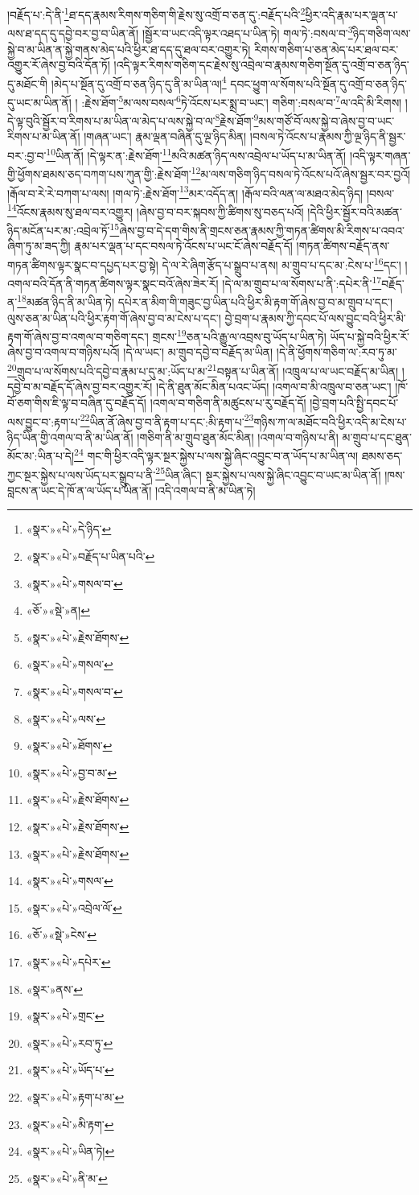 །བརྗོད་པ་:དེ་ནི་\footnote{«སྣར་»«པེ་»དེ་ཉིད་}ཐ་དད་རྣམས་རིགས་གཅིག་གི་རྗེས་སུ་འགྲོ་བ་ཅན་དུ་:བརྗོད་པའི་\footnote{«སྣར་»«པེ་»བརྗོད་པ་ཡིན་པའི་}ཕྱིར་འདི་རྣམ་པར་ལྡན་པ་ལས་ཐ་དད་དུ་དབྱེ་བར་བྱ་བ་ཡིན་ནོ། །སྦྱོར་བ་ཡང་འདི་ལྟར་འཐད་པ་ཡིན་ཏེ། གལ་ཏེ་:བསལ་བ་\footnote{«སྣར་»«པེ་»གསལ་བ་}ཉིད་གཅིག་ལས་སྐྱེ་བ་མ་ཡིན་ན་སྐྱེ་གནས་མེད་པའི་ཕྱིར་ཐ་དད་དུ་ཐལ་བར་འགྱུར་ཏེ། རིགས་གཅིག་པ་ཅན་མེད་པར་ཐལ་བར་འགྱུར་རོ་ཞེས་བྱ་བའི་དོན་ཏོ། །འདི་ལྟར་རིགས་གཅིག་དང་རྗེས་སུ་འབྲེལ་བ་རྣམས་གཅིག་སྔོན་དུ་འགྲོ་བ་ཅན་ཉིད་དུ་མཐོང་གི །མེད་པ་སྔོན་དུ་འགྲོ་བ་ཅན་ཉིད་དུ་ནི་མ་ཡིན་ལ།\footnote{«ཅོ་»«སྡེ་»ན།} དབང་ཕྱུག་ལ་སོགས་པའི་སྔོན་དུ་འགྲོ་བ་ཅན་ཉིད་དུ་ཡང་མ་ཡིན་ནོ། །
:རྗེས་ཐོག་\footnote{«སྣར་»«པེ་»རྗེས་ཐོགས་}མ་ལས་བསལ་\footnote{«སྣར་»«པེ་»གསལ་}ཏེ་འོངས་པར་སྨྲ་བ་ཡང་། གཅིག་:བསལ་བ་\footnote{«སྣར་»«པེ་»གསལ་བ་}ལ་འདི་མི་རིགས། །དེ་ལྟ་བུའི་སྦྱོར་བ་རིགས་པ་མ་ཡིན་ལ་མེད་པ་ལས་སྐྱེ་བ་ལ་\footnote{«སྣར་»«པེ་»ལས་}རྗེས་ཐོག་\footnote{«སྣར་»«པེ་»ཐོགས་}མས་གཙོ་བོ་ལས་སྐྱེ་བ་ཞེས་བྱ་བ་ཡང་རིགས་པ་མ་ཡིན་ནོ། །གཞན་ཡང་། རྣམ་ལྡན་བཞིན་དུ་ལྔ་ཉིད་མིན། །བསལ་ཏེ་འོངས་པ་རྣམས་ཀྱི་ལྔ་ཉིད་ནི་སྦྱར་བར་:བྱ་བ་\footnote{«སྣར་»«པེ་»བྱ་བ་མ་}ཡིན་ནོ། །དེ་ལྟར་ན་:རྗེས་ཐོག་\footnote{«སྣར་»«པེ་»རྗེས་ཐོགས་}མའི་མཚན་ཉིད་ལས་འབྲེལ་པ་ཡོད་པ་མ་ཡིན་ནོ། །འདི་ལྟར་གཞན་གྱི་ཕྱོགས་ཐམས་ཅད་བཀག་པས་ཀུན་གྱི་:རྗེས་ཐོག་\footnote{«སྣར་»«པེ་»རྗེས་ཐོགས་}མ་ལས་གཅིག་ཉིད་བསལ་ཏེ་འོངས་པའོ་ཞེས་སྦྱར་བར་བྱའོ། །རྒོལ་བ་རེ་རེ་བཀག་པ་ལས། །གལ་ཏེ་:རྗེས་ཐོག་\footnote{«སྣར་»«པེ་»རྗེས་ཐོགས་}མར་འདོད་ན། །རྒོལ་བའི་ལན་ལ་མཐའ་མེད་ཉིད། །བསལ་\footnote{«སྣར་»«པེ་»གསལ་}འོངས་རྣམས་སུ་ཐལ་བར་འགྱུར། །ཞེས་བྱ་བ་བར་སྐབས་ཀྱི་ཚིགས་སུ་བཅད་པའོ། །དེའི་ཕྱིར་སྦྱོར་བའི་མཚན་ཉིད་མངོན་པར་མ་:འབྲེལ་ཏོ་\footnote{«སྣར་»«པེ་»འབྲེལ་ལོ་}ཞེས་བྱ་བ་དེ་དག་གིས་ནི་གྲངས་ཅན་རྣམས་ཀྱི་གཏན་ཚིགས་མི་རིགས་པ་འབའ་ཞིག་ཏུ་མ་ཟད་ཀྱི། རྣམ་པར་ལྡན་པ་དང་བསལ་ཏེ་འོངས་པ་ཡང་ངོ་ཞེས་བརྗོད་དོ། །གཏན་ཚིགས་བརྗོད་ནས་གཏན་ཚིགས་ལྟར་སྣང་བ་དཔྱད་པར་བྱ་སྟེ། དེ་ལ་རེ་ཞིག་རྩོད་པ་སྒྲུབ་པ་ནས། མ་གྲུབ་པ་དང་མ་:ངེས་པ་\footnote{«ཅོ་»«སྡེ་»ངེས་}དང་། །འགལ་བའི་དོན་ནི་གཏན་ཚིགས་ལྟར་སྣང་བའོ་ཞེས་ཟེར་རོ། །དེ་ལ་མ་གྲུབ་པ་ལ་སོགས་པ་ནི་:དཔེར་ནི་\footnote{«སྣར་»«པེ་»དཔེར་}བརྗོད་ན་\footnote{«སྣར་»ནས་}མཚན་ཉིད་ནི་མ་ཡིན་ཏེ། དཔེར་ན་མིག་གི་གཟུང་བྱ་ཡིན་པའི་ཕྱིར་མི་རྟག་གོ་ཞེས་བྱ་བ་མ་གྲུབ་པ་དང་། ལུས་ཅན་མ་ཡིན་པའི་ཕྱིར་རྟག་གོ་ཞེས་བྱ་བ་མ་ངེས་པ་དང་། བྱེ་བྲག་པ་རྣམས་ཀྱི་དབང་པོ་ལས་བྱུང་བའི་ཕྱིར་མི་རྟག་གོ་ཞེས་བྱ་བ་འགལ་བ་གཅིག་དང་། གྲངས་\footnote{«སྣར་»«པེ་»གྲང་}ཅན་པའི་རྒྱུ་ལ་འབྲས་བུ་ཡོད་པ་ཡིན་ཏེ། ཡོད་པ་སྐྱེ་བའི་ཕྱིར་རོ་ཞེས་བྱ་བ་འགལ་བ་གཉིས་པའོ། །དེ་ལ་ཡང་། མ་གྲུབ་དབྱེ་བ་བརྗོད་མ་ཡིན། །དེ་ནི་ཕྱོགས་གཅིག་ལ་:རབ་ཏུ་མ་\footnote{«སྣར་»«པེ་»རབ་ཏུ་}གྲུབ་པ་ལ་སོགས་པའི་དབྱེ་བ་རྣམ་པ་དུ་མ་:ཡོད་པ་མ་\footnote{«སྣར་»«པེ་»ཡོད་པ་}བསྟན་པ་ཡིན་ནོ། །འཁྲུལ་པ་ལ་ཡང་བརྗོད་མ་ཡིན། །དབྱེ་བ་མ་བརྗོད་དོ་ཞེས་བྱ་བར་འགྱུར་རོ། །དེ་ནི་ཐུན་མོང་མིན་པའང་ཡོད། །འགལ་བ་མི་འཁྲུལ་བ་ཅན་ཡང་། །ཁོ་བོ་ཅག་གིས་ཇི་ལྟ་བ་བཞིན་དུ་བརྗོད་དོ། །འགལ་བ་གཅིག་ནི་མཚུངས་པ་རུ་བརྗོད་དོ། །བྱེ་བྲག་པའི་སྤྱི་དབང་པོ་ལས་བྱུང་བ་:རྟག་པ་\footnote{«སྣར་»«པེ་»རྟག་པ་མ་}ཡིན་ནོ་ཞེས་བྱ་བ་ནི་རྟག་པ་དང་:མི་རྟག་པ་\footnote{«སྣར་»«པེ་»མི་རྟག་}གཉིས་ཀ་ལ་མཐོང་བའི་ཕྱིར་འདི་མ་ངེས་པ་ཉིད་ཡིན་གྱི་འགལ་བ་ནི་མ་ཡིན་ནོ། །གཅིག་ནི་མ་གྲུབ་ཐུན་མོང་མིན། །འགལ་བ་གཉིས་པ་ནི། མ་གྲུབ་པ་དང་ཐུན་མོང་མ་:ཡིན་པ་དེ།\footnote{«སྣར་»«པེ་»ཡིན་ཏེ།} གང་གི་ཕྱིར་འདི་ལྟར་སྔར་སྐྱེས་པ་ལས་སྐྱེ་ཞིང་འབྱུང་བ་ན་ཡོད་པ་མ་ཡིན་ལ། ཐམས་ཅད་ཀྱང་སྔར་སྐྱེས་པ་ལས་ཡོད་པར་སྒྲུབ་པ་ནི་\footnote{«སྣར་»«པེ་»ནི་མ་}ཡིན་ཞིང་། སྔར་སྐྱེས་པ་ལས་སྐྱེ་ཞིང་འབྱུང་བ་ཡང་མ་ཡིན་ནོ། །ཁས་བླངས་ན་ཡང་དེ་ཁོ་ན་ལ་ཡོད་པ་ཡིན་ནོ། །འདི་འགལ་བ་ནི་མ་ཡིན་ཏེ། 